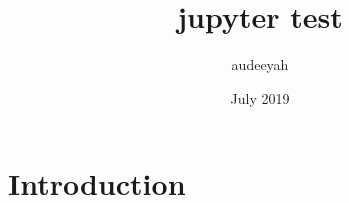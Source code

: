 \documentclass{article}
\title{jupyter test}
\author{audeeyah }
\date{July 2019}
\begin{document}
\maketitle

\section{Introduction}
\end{document}
